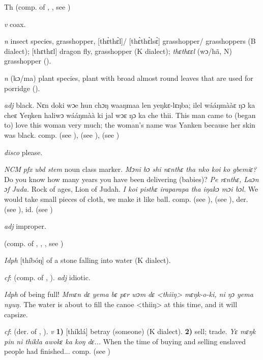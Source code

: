 \begin{letter}{Th}
 (comp. of , , see ) 

 \textit{v} coax.

 \textit{n} insect species, grasshopper, [thɛ̀thɛ̀l]/ [thɛ̀thɛ̀lsɛ̀] grasshopper/ grasshoppers (B dialect); [thɛthɛl] dragon fly, grasshopper (K dialect); \textit{thɛthɛɛl} (wɔ/hã, N) grasshopper (\citealt{Pichl1967}). 

 \textit{n} (kɔ/ma) plant species, plant with broad almost round leaves that are used for porridge (\citealt{Pichl1967}). 

 \textit{adj} black. {Nɛn doki wɔe hun chɔŋ waaŋmaa len yeŋkɛ-lɛŋba; ilel wááŋmààɛ ŋɔ ka cheɛ Yeŋken haliwɔ wááŋmàà ki jal wɔɛ ŋɔ ka che thii.} This man came to (began to) love this woman very much; the woman's name was Yanken because her skin was black. comp.  (see ),  (see ),  (see )

 \textit{disco} please.

 \textit{NCM} \textit{pfx} \textit{ubd stem} noun class marker. \textit{Mɔni bɔ shi nɛnthɛ tha nko koi ko gbemiɛ?} Do you know how many years you have been delivering (babies)? \textit{Pe rɛnthɛ, Laɔn ɔf Juda.} Rock of ages, Lion of Judah. \textit{I koi pisthɛ iraparapa tha iŋakɔ mɔi bɔl.} We would take small pieces of cloth, we make it like ball. comp.  (see ),  (see ), der.  (see ), id.  (see ) 

 \textit{adj} improper.

 (comp. of , , , see ) 

 \textit{Idph} [thíbóŋ] of a stone falling into water (K dialect). 

 \textit{cf}:  (comp. of , ). \textit{adj} idiotic.

 \textit{Idph} of being full! \textit{Mmɛn dɛ yema bɛ pɛr wɔm dɛ <thiiŋ> mɛŋk-o-ki, ni ŋɔ yema nyuŋ.} The water is about to fill the canoe <thiiŋ> at this time, and it will capsize.

 \textit{cf}:  (der. of , ). \textit{v} \textbf{1)} [thíklá] betray (someone) (K dialect). \textbf{2)} sell; trade. \textit{Yɛ mɛŋk pin ni thikla awokɛ ka koŋ dɛ...} When the time of buying and selling enslaved people had finished... comp.  (see ) 


\end{letter}
